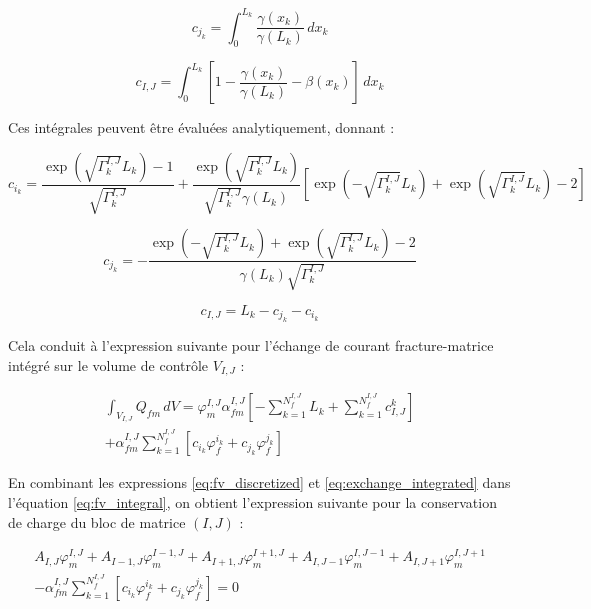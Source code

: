 \begin{equation}
c_{j_k} = \int_0^{L_k} \frac{\gamma(x_k)}{\gamma(L_k)} \, dx_k
\label{eq:cjk}
\end{equation}

\begin{equation}
c_{I,J} = \int_0^{L_k} \left[1 - \frac{\gamma(x_k)}{\gamma(L_k)} - \beta(x_k)\right] \, dx_k
\label{eq:cIJ}
\end{equation}

Ces intégrales peuvent être évaluées analytiquement, donnant :

\begin{equation}
c_{i_k} = \frac{\exp(\sqrt{\Gamma_k^{I,J}} L_k) - 1}{\sqrt{\Gamma_k^{I,J}}} + \frac{\exp(\sqrt{\Gamma_k^{I,J}} L_k)}{\sqrt{\Gamma_k^{I,J}} \gamma(L_k)} \left[\exp(-\sqrt{\Gamma_k^{I,J}} L_k) + \exp(\sqrt{\Gamma_k^{I,J}} L_k) - 2\right]
\label{eq:cik_explicit}
\end{equation}

\begin{equation}
c_{j_k} = -\frac{\exp(-\sqrt{\Gamma_k^{I,J}} L_k) + \exp(\sqrt{\Gamma_k^{I,J}} L_k) - 2}{\gamma(L_k) \sqrt{\Gamma_k^{I,J}}}
\label{eq:cjk_explicit}
\end{equation}

\begin{equation}
c_{I,J} = L_k - c_{j_k} - c_{i_k}
\label{eq:cIJ_explicit}
\end{equation}

Cela conduit à l'expression suivante pour l'échange de courant fracture-matrice intégré sur le volume de contrôle $V_{I,J}$ :

\begin{equation}
\begin{split}
\int_{V_{I,J}} Q_{fm} \, dV = \varphi_m^{I,J} \alpha_{fm}^{I,J} \left[-\sum_{k=1}^{N_f^{I,J}} L_k + \sum_{k=1}^{N_f^{I,J}} c_{I,J}^k\right] \\
+ \alpha_{fm}^{I,J} \sum_{k=1}^{N_f^{I,J}} \left[c_{i_k} \varphi_f^{i_k} + c_{j_k} \varphi_f^{j_k}\right]
\label{eq:exchange_integrated}
\end{split}
\end{equation}

En combinant les expressions \eqref{eq:fv_discretized} et \eqref{eq:exchange_integrated} dans l'équation \eqref{eq:fv_integral}, on obtient l'expression suivante pour la conservation de charge du bloc de matrice $(I,J)$ :

\begin{equation}
\begin{split}
A_{I,J} \varphi_m^{I,J} + A_{I-1,J} \varphi_m^{I-1,J} + A_{I+1,J} \varphi_m^{I+1,J} + A_{I,J-1} \varphi_m^{I,J-1} + A_{I,J+1} \varphi_m^{I,J+1} \\
- \alpha_{fm}^{I,J} \sum_{k=1}^{N_f^{I,J}} \left[c_{i_k} \varphi_f^{i_k} + c_{j_k} \varphi_f^{j_k}\right] = 0
\label{eq:matrix_conservation}
\end{split}
\end{equation}


